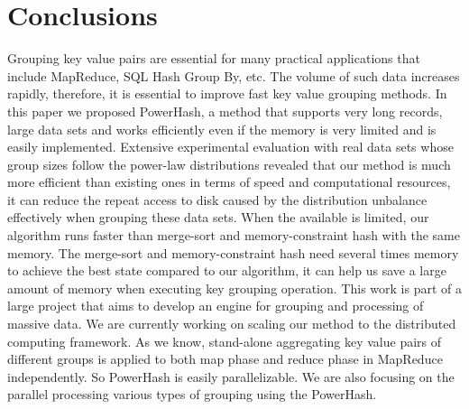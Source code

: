 \section{Conclusions}

Grouping key value pairs are essential for many practical applications that include MapReduce, SQL Hash Group By, etc. The volume of such data increases rapidly, therefore, it is essential to improve fast key value grouping methods. In this paper we proposed PowerHash, a method that supports very long records, large data sets and works efficiently even if the memory is very limited and is easily implemented. Extensive experimental evaluation with real data sets whose group sizes follow the power-law distributions revealed that our method is much more efficient than existing ones in terms of speed and computational resources, it can reduce the repeat access to disk caused by the distribution unbalance effectively when grouping these data sets. When the available is limited, our algorithm runs faster than merge-sort and memory-constraint hash with the same memory. The merge-sort and memory-constraint hash need several times memory to achieve the best state compared to our algorithm, it can help us save a large amount of memory when executing key grouping operation. This work is part of a large project that aims to develop an engine for grouping and processing of massive data. We are currently working on scaling our method to the distributed computing framework. As we know, stand-alone aggregating key value pairs of different groups is applied to both map phase and reduce phase in MapReduce independently. So PowerHash is easily parallelizable. We are also focusing on the parallel processing various types of grouping using the PowerHash.

